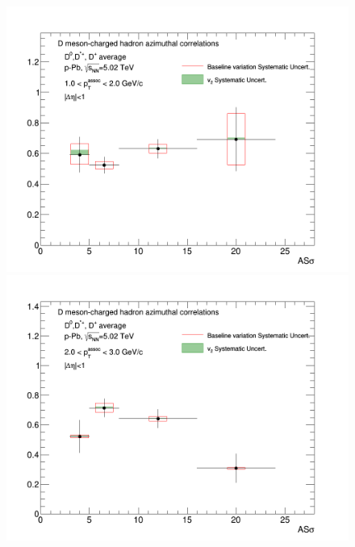 \begin{figure}[!htbp]
{\includegraphics[width=0.49\linewidth, height=0.33\linewidth]{figures/FitOutput/CanvasFinalTrendASSigma_pthad1dotto2dot.png}}
{\includegraphics[width=0.49\linewidth, height=0.33\linewidth]{figures/FitOutput/CanvasFinalTrendASSigma_pthad2dotto3dot.png}}
\end{figure}
